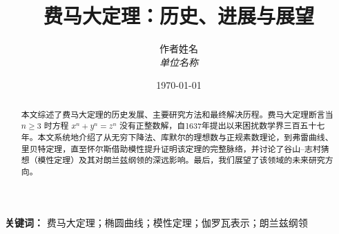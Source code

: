 \documentclass[12pt,a4paper]{article}
\title{费马大定理：历史、进展与展望}
\author{
    作者姓名\\
    \textit{单位名称}
}
\date{\today}
\numberwithin{equation}{section}
\begin{document}
\maketitle

\begin{abstract}
    本文综述了费马大定理的历史发展、主要研究方法和最终解决历程。费马大定理断言当 $n \ge 3$ 时方程 $x^n + y^n = z^n$ 没有正整数解，自1637年提出以来困扰数学界三百五十七年。本文系统地介绍了从无穷下降法、库默尔的理想数与正规素数理论，到弗雷曲线、里贝特定理，直至怀尔斯借助模性提升证明该定理的完整脉络，并讨论了谷山--志村猜想（模性定理）及其对朗兰兹纲领的深远影响。最后，我们展望了该领域的未来研究方向。
\end{abstract}

\textbf{关键词：} 费马大定理；椭圆曲线；模性定理；伽罗瓦表示；朗兰兹纲领

\tableofcontents
\newpage












\appendix

\end{document}
